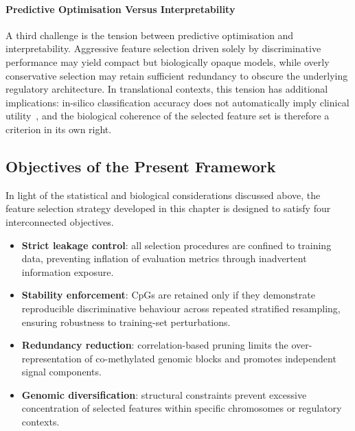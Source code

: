 \paragraph{Predictive Optimisation Versus Interpretability}
A third challenge is the tension between predictive optimisation and 
interpretability. Aggressive feature selection driven solely by 
discriminative performance may yield compact but biologically opaque 
models, while overly conservative selection may retain sufficient 
redundancy to obscure the underlying regulatory architecture. In 
translational contexts, this tension has additional implications: 
in-silico classification accuracy does not automatically imply 
clinical utility~\cite{Poste2011}, and the biological coherence of 
the selected feature set is therefore a criterion in its own right.

\subsection{Objectives of the Present Framework}
\label{sec:fs_stability}
In light of the statistical and biological considerations discussed above, 
the feature selection strategy developed in this chapter is designed to 
satisfy four interconnected objectives.

\begin{itemize}[label=-]
    \item \textbf{Strict leakage control}: all selection procedures are 
    confined to training data, preventing inflation of evaluation metrics 
    through inadvertent information exposure.

    \item \textbf{Stability enforcement}: CpGs are retained only if they 
    demonstrate reproducible discriminative behaviour across repeated 
    stratified resampling, ensuring robustness to training-set perturbations.

    \item \textbf{Redundancy reduction}: correlation-based pruning limits 
    the over-representation of co-methylated genomic blocks and promotes 
    independent signal components.

    \item \textbf{Genomic diversification}: structural constraints prevent 
    excessive concentration of selected features within specific chromosomes 
    or regulatory contexts.
\end{itemize}

